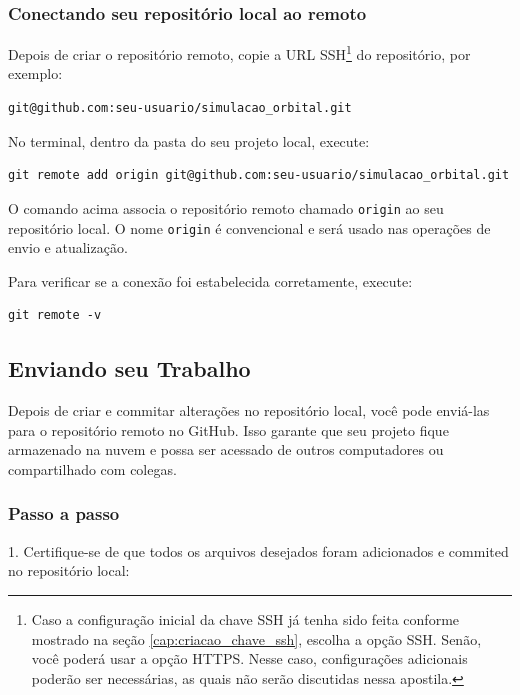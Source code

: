 \subsubsection*{Conectando seu repositório local ao remoto}

Depois de criar o repositório remoto, copie a URL SSH\footnote{Caso a configuração inicial da chave SSH já tenha sido feita conforme mostrado na seção \ref{cap:criacao_chave_ssh}, escolha a opção SSH. Senão, você poderá usar a opção HTTPS. Nesse caso, configurações adicionais poderão ser necessárias, as quais não serão discutidas nessa apostila.} do repositório, por exemplo:

\begin{verbatim}
git@github.com:seu-usuario/simulacao_orbital.git
\end{verbatim}

No terminal, dentro da pasta do seu projeto local, execute:

\begin{lstlisting}[style=shellstyle]
git remote add origin git@github.com:seu-usuario/simulacao_orbital.git
\end{lstlisting}

\noindent
O comando acima associa o repositório remoto chamado \texttt{origin} ao seu repositório local. O nome \texttt{origin} é convencional e será usado nas operações de envio e atualização.

Para verificar se a conexão foi estabelecida corretamente, execute:

\begin{lstlisting}[style=shellstyle]
git remote -v
\end{lstlisting}


\subsection{Enviando seu Trabalho}

Depois de criar e commitar alterações no repositório local, você pode enviá-las para o repositório remoto no GitHub. Isso garante que seu projeto fique armazenado na nuvem e possa ser acessado de outros computadores ou compartilhado com colegas.

\subsubsection*{Passo a passo}

1. Certifique-se de que todos os arquivos desejados foram adicionados e commited no repositório local:

